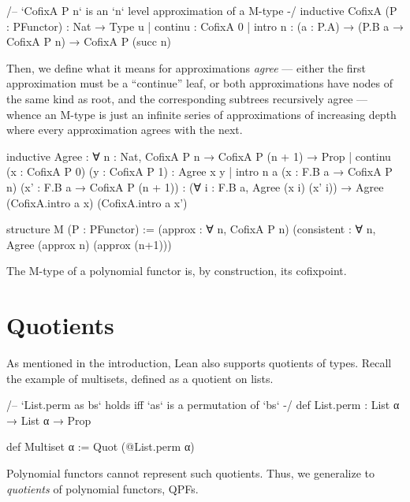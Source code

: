 \begin{leancode}
  /-- `CofixA P n` is an `n` level approximation of a M-type -/
  inductive CofixA (P : PFunctor) : Nat → Type u
  | continu : CofixA 0
  | intro {n} : (a : P.A) → (P.B a → CofixA P n) → CofixA P (succ n)
\end{leancode}

Then, we define what it means for approximations \emph{agree} --- either the first approximation must be a ``continue'' leaf, or both approximations have nodes of the same kind as root, and the corresponding subtrees recursively agree --- whence an M-type is just an infinite series of approximations of increasing depth where every approximation agrees with the next.

\begin{leancode}
  inductive Agree : ∀ {n : Nat}, CofixA P n → CofixA P (n + 1) → Prop
  | continu (x : CofixA P 0) (y : CofixA P 1) : Agree x y
  | intro {n} {a}   (x  : F.B a → CofixA P n) 
                    (x' : F.B a → CofixA P (n + 1)) 
                    : (∀ i : F.B a, Agree (x i) (x' i))
                    → Agree (CofixA.intro a x) (CofixA.intro a x')

  structure M (P : PFunctor) := 
    (approx : ∀ n, CofixA P n)
    (consistent : ∀ n, Agree (approx n) (approx (n+1)))
\end{leancode}

The M-type of a polynomial functor is, by construction, its cofixpoint.

\section{Quotients}
As mentioned in the introduction, Lean also supports quotients of types.
Recall the example of multisets, defined as a quotient on lists.

\begin{leancode}
    /-- `List.perm as bs` holds iff `as` is a permutation of `bs` -/
    def List.perm : List α → List α → Prop

    def Multiset α := Quot (@List.perm α)
\end{leancode}

Polynomial functors cannot represent such quotients. Thus, we generalize to \emph{quotients} of polynomial functors, QPFs.

